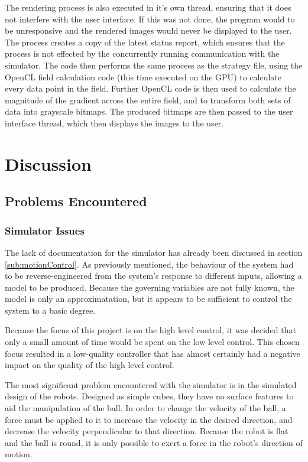 \documentclass[10pt]{article}
\begin{document}
The rendering process is also executed in it's own thread, ensuring that it does
not interfere with the user interface. If this was not done, the program would
to be unresponsive and the rendered images would never be displayed to the user.
The process creates a copy of the latest status report, which ensures that the
process is not effected by the concurrently running communication with the
simulator. The code then performs the same process as the strategy file, using
the OpenCL field calculation code (this time executed on the \ac{GPU}) to
calculate every data point in the field. Further OpenCL code is then used to
calculate the magnitude of the gradient across the entire field, and to
transform both sets of data into grayscale bitmaps. The produced bitmaps are
then passed to the user interface thread, which then displays the images to the
user.

\section{Discussion}

\subsection{Problems Encountered} 

\subsubsection{Simulator Issues\label{sub:simulatorIssues}}

The lack of documentation for the simulator has already been discussed in
section \ref{sub:motionControl}.  As previously mentioned, the behaviour of the
system had to be reverse-engineered from the system's response to different inputs, allowing a
model to be produced.  Because the governing variables are not fully known, the
model is only an approximatation, but it appears to be sufficient to control the
system to a basic degree.

Because the focus of this project is on the high level control, it was decided
that only a small amount of time would be spent on the low level control.  This
chosen focus resulted in a low-quality controller that has almost certainly had
a negative impact on the quality of the high level control.

The most significant problem encountered with the simulator is in the simulated
design of the robots.  Designed as simple cubes, they have no surface features
to aid the manipulation of the ball.  In order to change the velocity of the
ball, a force must be applied to it to increase the velocity in the desired
direction, and decrease the velocity perpendicular to that direction.  Because
the robot is flat and the ball is round, it is only possible to exert a force in
the robot's direction of motion.
\end{document}
